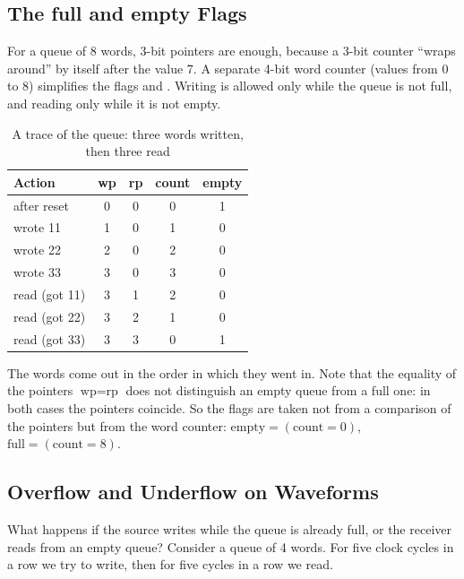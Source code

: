 \subsection{The full and empty Flags}

For a queue of 8 words, 3-bit pointers are enough, because a 3-bit counter
``wraps around'' by itself after the value 7. A separate 4-bit word counter
 (values from 0 to 8) simplifies the flags  and
. Writing is allowed only while the queue is not full, and reading
only while it is not empty.

\begin{table}[H]
\centering
\caption{A trace of the queue: three words written, then three read}
\small
\begin{tabular}{lcccc}
\toprule
\textbf{Action} & \textbf{wp} & \textbf{rp} & \textbf{count} & \textbf{empty} \\
\midrule
after reset & 0 & 0 & 0 & 1 \\
wrote 11 & 1 & 0 & 1 & 0 \\
wrote 22 & 2 & 0 & 2 & 0 \\
wrote 33 & 3 & 0 & 3 & 0 \\
read (got 11) & 3 & 1 & 2 & 0 \\
read (got 22) & 3 & 2 & 1 & 0 \\
read (got 33) & 3 & 3 & 0 & 1 \\
\bottomrule
\end{tabular}
\end{table}

The words come out in the order in which they went in. Note that the equality
of the pointers $\text{wp}=\text{rp}$ does not distinguish an empty queue from
a full one: in both cases the pointers coincide. So the flags are taken not from
a comparison of the pointers but from the word counter:
$\text{empty}=(\text{count}=0)$, $\text{full}=(\text{count}=8)$.

\subsection{Overflow and Underflow on Waveforms}

What happens if the source writes while the queue is already full, or the
receiver reads from an empty queue? Consider a queue of 4 words. For five
clock cycles in a row we try to write, then for five cycles in a row we read.

